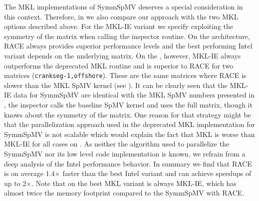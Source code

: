 The MKL implementations of \acrshort{SymmSpMV} deserves a special consideration in this context.
Therefore,  in  we also compare  our approach with the two \acrshort{MKL} options described above. For the MKL-IE variant we specify exploiting the symmetry of the matrix when calling the inspector routine. 
On the \IVB architecture, \acrshort{RACE} always provides superior performance levels and the best performing Intel variant depends on the underlying matrix. On the \SKX, however, MKL-IE always outperforms the deprecated MKL routine and is superior to \acrshort{RACE} for two matrices (\texttt{crankseg-1,offshore}). These are the same matrices where \acrshort{RACE} is slower than the MKL \acrshort{SpMV} kernel (see ). It can be clearly seen that the MKL-IE data for \acrshort{SymmSpMV} 
 are identical with the MKL \acrshort{SpMV} numbers presented in , \ie the inspector calls the baseline \acrshort{SpMV} kernel and uses the full matrix, though it knows about the symmetry of the matrix. One reason for that strategy might be that the parallelization approach used in the deprecated MKL implementation for \acrshort{SymmSpMV} is not scalable which would explain the fact that MKL is worse than MKL-IE for all cases on \SKX.  As neither the algorithm used to parallelize the \acrshort{SymmSpMV} nor its low level code implementation is known, we refrain from a deep analysis of the Intel performance behavior. 
In summary we find that \acrshort{RACE} is on average 1.4$\times$ faster than the best Intel variant and can achieve speedups of up to 2$\times$. 
Note that on \SKX the best MKL variant is always MKL-IE, 
	which has almost twice the memory footprint 
	compared to the  \acrshort{SymmSpMV} with \acrshort{RACE}.

